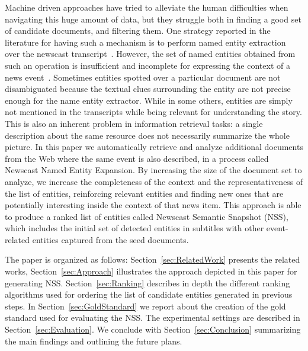 \documentclass{llncs}
\newcommand{\todo}[1]{\colorbox{red}{#1}}
\begin{document}
Machine driven approaches have tried to alleviate the human difficulties when navigating this huge amount of data, but they struggle both in finding a good set of candidate documents, and filtering them.
One strategy reported in the literature for having such a mechanism is to perform named entity extraction over the newscast transcript~\cite{Yunjia2012}. However, the set of named entities obtained from such an operation is insufficient and incomplete for expressing the context of a news event~\cite{Henzinger2003}. Sometimes entities spotted over a particular document are not disambiguated because the textual clues surrounding the entity are not precise enough for the name entity extractor. While in some others, entities are simply not mentioned in the transcripts while being relevant for understanding the story. This is also an inherent problem in information retrieval tasks: a single description about the same resource does not necessarily summarize the whole picture. In this paper we automatically retrieve and analyze additional documents from the Web where the same event is also described, in a process called Newscast Named Entity Expansion. By increasing the size of the document set to analyze, we increase the completeness of the context and the representativeness of the list of entities, reinforcing relevant entities and finding new ones that are potentially interesting inside the context of that news item. This approach is able to produce a ranked list of entities called Newscast Semantic Snapshot (NSS), which includes the initial set of detected entities in subtitles with other event-related entities captured from the seed documents. 

The paper is organized as follows: Section~\ref{sec:RelatedWork} presents the related works, Section~\ref{sec:Approach} illustrates the approach depicted in this paper for generating NSS. Section~\ref{sec:Ranking} describes in depth the different ranking algorithms used for ordering the list of candidate entities generated in previous steps. In Section~\ref{sec:GoldStandard} we report about the creation of the gold standard used for evaluating the NSS. The experimental settings are described in Section~\ref{sec:Evaluation}. We conclude with Section~\ref{sec:Conclusion} summarizing the main findings and outlining the future plans.
\end{document}
